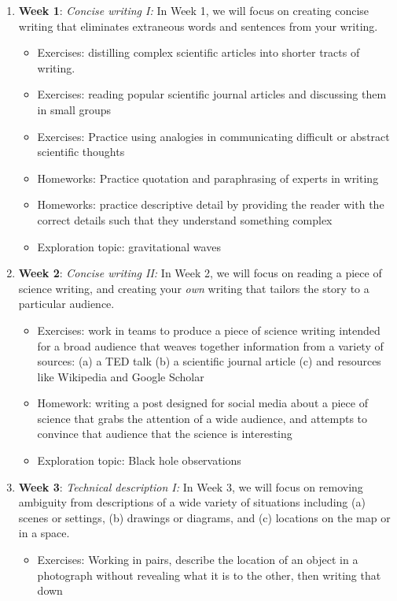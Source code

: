 \documentclass[10pt]{article}
\begin{document}
\begin{enumerate}
\item \textbf{Week 1}: \textit{Concise writing I:} In Week 1, we will focus on creating concise writing that eliminates extraneous words and sentences from your writing.
\begin{itemize}
\item Exercises: distilling complex scientific articles into shorter tracts of writing.
\item Exercises: reading popular scientific journal articles and discussing them in small groups
\item Exercises: Practice using analogies in communicating difficult or abstract scientific thoughts
\item Homeworks: Practice quotation and paraphrasing of experts in writing
\item Homeworks: practice descriptive detail by providing the reader with the correct details such that they understand something complex
\item Exploration topic: gravitational waves
\end{itemize}
\item \textbf{Week 2}: \textit{Concise writing II:} In Week 2, we will focus on reading a piece of science writing, and creating your \textit{own} writing that tailors the story to a particular audience.
\begin{itemize}
\item Exercises: work in teams to produce a piece of science writing intended for a broad audience that weaves together information from a variety of sources: (a) a TED talk (b) a scientific journal article (c) and resources like Wikipedia and Google Scholar
\item Homework: writing a post designed for social media about a piece of science that grabs the attention of a wide audience, and attempts to convince that audience that the science is interesting
\item Exploration topic: Black hole observations
\end{itemize}
\item \textbf{Week 3}: \textit{Technical description I:} In Week 3, we will focus on removing ambiguity from descriptions of a wide variety of situations including (a) scenes or settings, (b) drawings or diagrams, and (c) locations on the map or in a space.
\begin{itemize}
\item Exercises: Working in pairs, describe the location of an object in a photograph without revealing what it is to the other, then writing that down

\end{itemize}
\end{enumerate}
\end{document}
